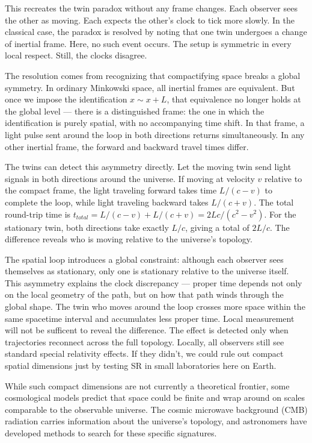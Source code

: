 This recreates the twin paradox without any frame changes. Each observer sees the other as moving. Each expects the other's clock to tick more slowly. In the classical case, the paradox is resolved by noting that one twin undergoes a change of inertial frame. Here, no such event occurs. The setup is symmetric in every local respect. Still, the clocks disagree.

The resolution comes from recognizing that compactifying space breaks a global symmetry. In ordinary Minkowski space, all inertial frames are equivalent. But once we impose the identification $x \sim x + L$, that equivalence no longer holds at the global level — there is a distinguished frame: the one in which the identification is purely spatial, with no accompanying time shift. In that frame, a light pulse sent around the loop in both directions returns simultaneously. In any other inertial frame, the forward and backward travel times differ.

The twins can detect this asymmetry directly. Let the moving twin send light signals in both directions around the universe. If moving at velocity $v$ relative to the compact frame, the light traveling forward takes time $L/(c-v)$ to complete the loop, while light traveling backward takes $L/(c+v)$. The total round-trip time is $t_{total} = L/(c-v) + L/(c+v) = 2Lc/(c^2-v^2)$. For the stationary twin, both directions take exactly $L/c$, giving a total of $2L/c$. The difference reveals who is moving relative to the universe's topology.

The spatial loop introduces a global constraint: although each observer sees themselves as stationary, only one is stationary relative to the universe itself. This asymmetry explains the clock discrepancy — proper time depends not only on the local geometry of the path, but on how that path winds through the global shape. The twin who moves around the loop crosses more space within the same spacetime interval and accumulates less proper time. Local measurement will not be sufficent to reveal the difference. The effect is detected only when trajectories reconnect across the full topology. Locally, all observers still see standard special relativity effects. If they didn't, we could rule out compact spatial dimensions just by testing SR in small laboratories here on Earth.

While such compact dimensions are not currently a theoretical frontier, some cosmological models predict that space could be finite and wrap around on scales comparable to the observable universe. The cosmic microwave background (CMB) radiation carries information about the universe's topology, and astronomers have developed methods to search for these specific signatures.


